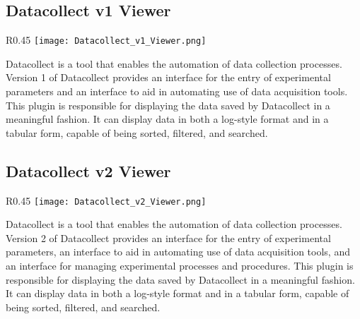 \documentclass[10pt]{article}
\begin{document}
\endgroup

\clearpage
\begingroup
\setlength\intextsep{0pt}
\subsection{Datacollect v1 Viewer}
\begin{wrapfigure}[20]{R}{0.45\textwidth}
		\texttt{[image: Datacollect\_v1\_Viewer.png]}
\end{wrapfigure}
Datacollect is a tool that enables the automation of data collection processes.  Version 1 of Datacollect provides an interface for the entry of experimental parameters and an interface to aid in automating use of data acquisition tools.  This plugin is responsible for displaying the data saved by Datacollect in a meaningful fashion.  It can display data in both a log-style format and in a tabular form, capable of being sorted, filtered, and searched.

\endgroup

\hfill\break
\hfill\break

\begingroup
\setlength\intextsep{0pt}
\subsection{Datacollect v2 Viewer}
\begin{wrapfigure}[20]{R}{0.45\textwidth}
		\texttt{[image: Datacollect\_v2\_Viewer.png]}
\end{wrapfigure}
Datacollect is a tool that enables the automation of data collection processes.  Version 2 of Datacollect provides an interface for the entry of experimental parameters, an interface to aid in automating use of data acquisition tools, and an interface for managing experimental processes and procedures.  This plugin is responsible for displaying the data saved by Datacollect in a meaningful fashion.  It can display data in both a log-style format and in a tabular form, capable of being sorted, filtered, and searched.

\endgroup

\hfill \break
\hfill \break
\hfill \break
\hfill \break
\hfill \break
\hfill \break
\hfill \break
\hfill \break
\hfill \break

\begingroup
\setlength\intextsep{0pt}
\end{document}
